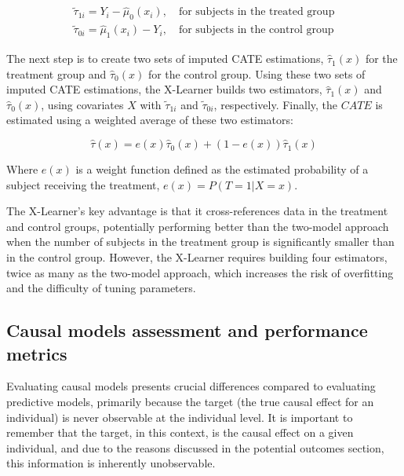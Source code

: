 \begin{equation}
  \begin{aligned}
    \tilde{\tau}_{1i} = Y_i - \hat{\mu}_0(x_i), \quad \text{for subjects in the treated group} \\
    \tilde{\tau}_{0i} = \hat{\mu}_1(x_i) - Y_i, \quad \text{for subjects in the control group}
  \end{aligned}
  \label{eq:x_learner_imputed_effects}
\end{equation}

The next step is to create two sets of imputed CATE estimations, $\hat{\tau}_1(x)$ for the treatment group and $\hat{\tau}_0(x)$ for the control group. Using these two sets of imputed CATE estimations, the X-Learner 
builds two estimators, $\hat{\tau}_1(x)$ and $\hat{\tau}_0(x)$, using covariates $X$ with $\tilde{\tau}_{1i}$ and $\tilde{\tau}_{0i}$, respectively. Finally, the $CATE$ is estimated using a weighted average of these two estimators:

\begin{equation}
  \hat{\tau}(x) = e(x) \hat{\tau}_0(x) + (1 - e(x)) \hat{\tau}_1(x)
  \label{eq:x_learner}
\end{equation}

Where $e(x)$ is a weight function defined as the estimated probability of a subject receiving the treatment, $e(x) = P(T = 1 | X = x)$.

The X-Learner’s key advantage is that it cross-references data in the treatment and control groups, potentially performing better than the two-model approach when the number of subjects in the treatment group is significantly 
smaller than in the control group. However, the X-Learner requires building four estimators, twice as many as the two-model approach, which increases the risk of overfitting and the difficulty of tuning parameters.

\subsection{Causal models assessment and performance metrics}
\label{sub:causal_models_assessment}

Evaluating causal models presents crucial differences compared to evaluating predictive models, primarily because the target (the true causal effect for an individual) is never observable at the individual level. 
It is important to remember that the target, in this context, is the causal effect on a given individual, and due to the reasons discussed in the potential outcomes section, this information is inherently unobservable.

